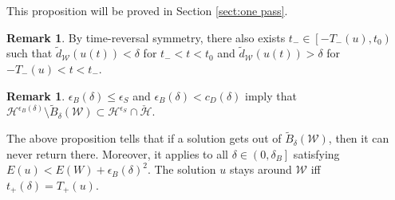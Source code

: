 \documentclass[reqno, 11pt]{amsart}
\numberwithin{equation}{section}
\theoremstyle{plain}
\theoremstyle{definition}
\newtheorem{remark}[theorem]{Remark}
\numberwithin{equation}{section}
\numberwithin{theorem}{section}
\numberwithin{equation}{section}
\numberwithin{equation}{section}
\numberwithin{theorem}{section}
\begin{document}
	This proposition will be proved in Section \ref{sect:one pass}.
	
	\begin{remark}
		By time-reversal symmetry, there  also exists $t_{-}\in \left[-T_{-}(u),t_0 \right)$ such that $\widetilde{d}_{\mathcal{W}}(u(t))<\delta$ for $t_{-}<t<t_0$ and $\widetilde{d}_{\mathcal{W}}(u(t))>\delta$ for $-T_{-}(u)<t<t_{-}$.
	\end{remark}
	\begin{remark}\label{rmk:incln relat}
		$\epsilon_{B}(\delta)\leq \epsilon_{S}$ and $\epsilon_{B}(\delta)<c_D(\delta)$ imply that $\mathcal{H}^{\epsilon_{B}(\delta)}\setminus \widetilde{B}_{\delta}(\mathcal{W})\subset \mathcal{H}^{\epsilon_S} \cap \check{\mathcal{H}}$.
	\end{remark}
	The above proposition tells that if a solution gets out of $\widetilde{B}_{\delta}(\mathcal{W})$, then it can never return there. Moreover, it applies to all $\delta \in \left(0,\delta_{B} \right]$ satisfying $E(u)<E(W)+\epsilon_{B}(\delta)^2$. The solution $u$ stays around $\mathcal{W}$ iff $t_{+}(\delta)=T_{+}(u)$.
	
	
	
	
	
\end{document}
